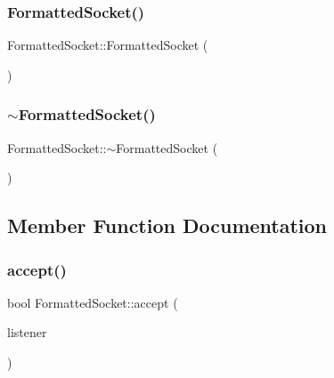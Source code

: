 \subsubsection{\texorpdfstring{FormattedSocket()}{FormattedSocket()}}
{\footnotesize\ttfamily Formatted\+Socket\+::\+Formatted\+Socket (\begin{DoxyParamCaption}{ }\end{DoxyParamCaption})}

\mbox{\label{class_formatted_socket_a57919c89221556fbd836c61f9ee3d62c}} 
\subsubsection{\texorpdfstring{$\sim$FormattedSocket()}{~FormattedSocket()}}
{\footnotesize\ttfamily Formatted\+Socket\+::$\sim$\+Formatted\+Socket (\begin{DoxyParamCaption}{ }\end{DoxyParamCaption})\hspace{0.3cm}{\ttfamily [default]}}



\subsection{Member Function Documentation}
\mbox{\label{class_formatted_socket_a857affefd4b2a9e37acdf9bac488ada0}} 
\subsubsection{\texorpdfstring{accept()}{accept()}}
{\footnotesize\ttfamily bool Formatted\+Socket\+::accept (\begin{DoxyParamCaption}\item[{sf\+::\+Tcp\+Listener \&}]{listener }\end{DoxyParamCaption})}

\mbox{\label{class_formatted_socket_a41c035d03d50a2a0b971e0ff2b8aadeb}} 

